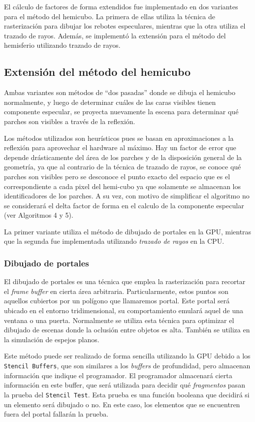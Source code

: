 El cálculo de factores de forma extendidos fue implementado en dos variantes para el método del hemicubo. La primera de ellas utiliza la técnica de rasterización para dibujar los rebotes especulares, mientras que la otra utiliza el trazado de rayos. Además, se implementó la extensión para el método del hemisferio utilizando trazado de rayos.

\subsection{Extensión del método del hemicubo}
Ambas variantes son métodos de “dos pasadas” donde se dibuja el hemicubo normalmente, y luego de determinar cuáles de las caras visibles tienen componente especular, se proyecta nuevamente la escena para determinar qué parches son visibles a través de la reflexión.

Los métodos utilizados son heurísticos pues se basan en aproximaciones a la reflexión para aprovechar el hardware al máximo. Hay un factor de error que depende drásticamente del área de los parches y de la disposición general de la geometría, ya que al contrario de la técnica de trazado de rayos, se conoce qué parches son visibles pero se desconoce el punto exacto del espacio que es el correspondiente a cada pixel del hemi-cubo ya que solamente se almacenan los identificadores de los parches. A su vez, con motivo de simplificar el algoritmo no se considerará el delta factor de forma en el calculo de la componente especular (ver Algoritmos 4 y 5).

La primer variante utiliza el método de dibujado de portales en la GPU, mientras que la segunda fue implementada utilizando \textit{trazado de rayos} en la CPU.

\subsubsection{Dibujado de portales}

El dibujado de portales es una técnica que emplea la rasterización para recortar el \textit{frame buffer} en cierta área arbitraria. Particularmente, estos puntos son aquellos cubiertos por un polígono que llamaremos portal. Este portal será ubicado en el entorno tridimensional, su comportamiento emulará aquel de una ventana o una puerta. Normalmente se utiliza esta técnica para optimizar el dibujado de escenas donde la oclusión entre objetos es alta. También se utiliza en la simulación de espejos planos.

Este método puede ser realizado de forma sencilla utilizando la GPU debido a los \verb|Stencil Buffers|, que son similares a los \textit{buffers} de profundidad, pero almacenan información que indique el programador. El programador almacenará cierta información en este buffer, que será utilizada para decidir qué \textit{fragmentos} pasan la prueba del \verb|Stencil Test|. Esta prueba es una función booleana que decidirá si un elemento será dibujado o no. En este caso, los elementos que se encuentren fuera del portal fallarán la prueba.

